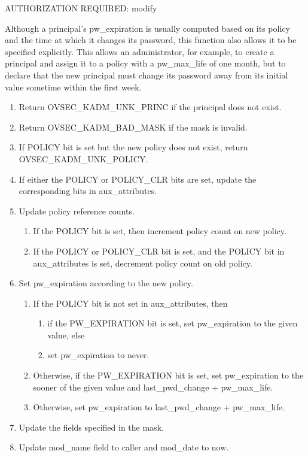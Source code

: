 AUTHORIZATION REQUIRED: modify

Although a principal's pw_expiration is usually computed based on its
policy and the time at which it changes its password, this function
also allows it to be specified explicitly.  This allows an
administrator, for example, to create a principal and assign it to a
policy with a pw_max_life of one month, but to declare that the new
principal must change its password away from its initial value
sometime within the first week.

\begin{enumerate}
\item Return OVSEC_KADM_UNK_PRINC if the principal does not exist.
\item Return OVSEC_KADM_BAD_MASK if the mask is invalid.
\item If POLICY bit is set but the new policy does not exist, return
OVSEC_KADM_UNK_POLICY.
\item If either the POLICY or POLICY_CLR bits are set, update the
corresponding bits in aux_attributes.

\item Update policy reference counts.
\begin{enumerate}
\item If the POLICY bit is set, then increment policy count on new
policy.
\item If the POLICY or POLICY_CLR bit is set, and the POLICY bit in
aux_attributes is set, decrement policy count on old policy.
\end{enumerate}

\item Set pw_expiration according to the new policy.
\begin{enumerate}
\item If the POLICY bit is not set in aux_attributes, then
\begin{enumerate}
\item if the PW_EXPIRATION bit is set, set pw_expiration to the given
value, else
\item set pw_expiration to never.
\end{enumerate}
\item Otherwise, if the PW_EXPIRATION bit is set, set pw_expiration to
the sooner of the given value and last_pwd_change + pw_max_life.
\item Otherwise, set pw_expiration to last_pwd_change + pw_max_life.
\end{enumerate}

\item Update the fields specified in the mask.
\item Update mod_name field to caller and mod_date to now.
\end{enumerate}

